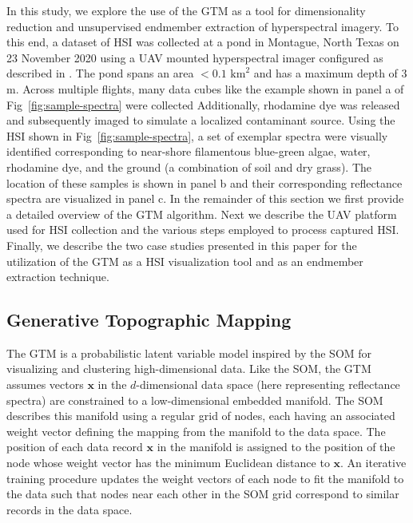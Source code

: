 \documentclass[remotesensing,article,submit,pdftex,moreauthors]{Definitions/mdpi}
\begin{document}
In this study, we explore the use of the GTM as a tool for dimensionality reduction and unsupervised endmember extraction of hyperspectral imagery. To this end, a dataset of HSI was collected at a pond in Montague, North Texas on 23 November 2020 using a UAV mounted hyperspectral imager configured as described in \cite{robot-team-1, robot-team-2}. The pond spans an area $<0.1$ $\text{km}^2$ and has a maximum depth of $3$ m. Across multiple flights, many data cubes like the example shown in panel a of Fig~\ref{fig:sample-spectra} were collected Additionally, rhodamine dye was released and subsequently imaged to simulate a localized contaminant source. Using the HSI shown in Fig~\ref{fig:sample-spectra}, a set of exemplar spectra were visually identified corresponding to near-shore filamentous blue-green algae, water, rhodamine dye, and the ground (a combination of soil and dry grass). The location of these samples is shown in panel b and their corresponding reflectance spectra are visualized in panel c.  In the remainder of this section we first provide a detailed overview of the GTM algorithm. Next we describe the UAV platform used for HSI collection and the various steps employed to process captured HSI. Finally, we describe the two case studies presented in this paper for the utilization of the GTM as a HSI visualization tool and as an endmember extraction technique.

\subsection{Generative Topographic Mapping}\label{sec:gtm-overview}

The GTM is a probabilistic latent variable model inspired by the SOM for visualizing and clustering high-dimensional data. Like the SOM, the GTM assumes vectors $\mathbf{x}$ in the $d$-dimensional data space (here representing reflectance spectra) are constrained to a low-dimensional embedded manifold. The SOM describes this manifold using a regular grid of nodes, each having an associated weight vector defining the mapping from the manifold to the data space. The position of each data record $\mathbf{x}$ in the manifold is assigned to the position of the node whose weight vector has the minimum Euclidean distance to $\mathbf{x}$. An iterative training procedure updates the weight vectors of each node to fit the manifold to the data such that nodes near each other in the SOM grid correspond to similar records in the data space.
\end{document}
